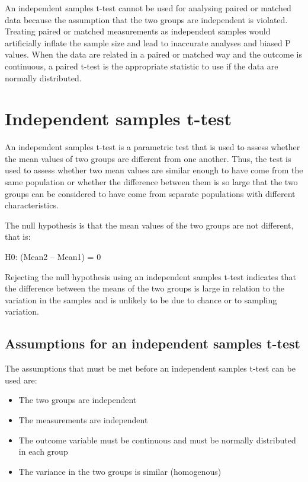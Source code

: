 \documentclass[
]{memoir}
\providecommand{\tightlist}{%
  \setlength{\itemsep}{0pt}\setlength{\parskip}{0pt}}
\begin{document}
An independent samples t-test cannot be used for analysing paired or matched data because the assumption that the two groups are independent is violated. Treating paired or matched measurements as independent samples would artificially inflate the sample size and lead to inaccurate analyses and biased P values. When the data are related in a paired or matched way and the outcome is continuous, a paired t-test is the appropriate statistic to use if the data are normally distributed.

\hypertarget{independent-samples-t-test}{%
\section{Independent samples t-test}\label{independent-samples-t-test}}

An independent samples t-test is a parametric test that is used to assess whether the mean values of two groups are different from one another. Thus, the test is used to assess whether two mean values are similar enough to have come from the same population or whether the difference between them is so large that the two groups can be considered to have come from separate populations with different characteristics.

The null hypothesis is that the mean values of the two groups are not different, that is:

H0: (Mean2 -- Mean1) = 0

Rejecting the null hypothesis using an independent samples t-test indicates that the difference between the means of the two groups is large in relation to the variation in the samples and is unlikely to be due to chance or to sampling variation.

\hypertarget{assumptions-for-an-independent-samples-t-test}{%
\subsection{Assumptions for an independent samples t-test}\label{assumptions-for-an-independent-samples-t-test}}

The assumptions that must be met before an independent samples t-test can be used are:

\begin{itemize}
\tightlist
\item
  The two groups are independent
\item
  The measurements are independent
\item
  The outcome variable must be continuous and must be normally distributed in each group
\item
  The variance in the two groups is similar (homogenous)
\end{itemize}
\end{document}
